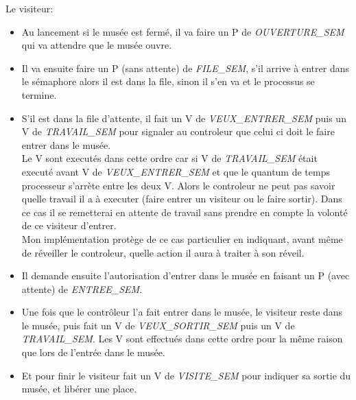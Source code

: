 \documentclass[a4paper,12pt,DIV=16]{scrreprt}
\begin{document}
    Le visiteur:
    \begin{itemize}
        \item Au lancement si le musée est fermé, il va faire un P de \emph{OUVERTURE\_SEM} qui va attendre
            que le musée ouvre.
        \item Il va ensuite faire un P (sans attente) de \emph{FILE\_SEM}, s'il arrive à entrer dans le
            sémaphore alors il est dans la file, sinon il s'en va et le processus se termine.
        \item S'il est dans la file d'attente, il fait un V de \emph{VEUX\_ENTRER\_SEM} puis un V de
            \emph{TRAVAIL\_SEM} pour signaler au controleur que celui ci doit le faire entrer dans le musée.\\
            Le V sont executés dans cette ordre car si V de \emph{TRAVAIL\_SEM} était executé avant V de
            \emph{VEUX\_ENTRER\_SEM} et que le quantum de temps processeur s'arrète entre les deux V.
            Alors le controleur ne peut pas savoir quelle travail il a à executer (faire entrer un
            visiteur ou le faire sortir). Dans ce cas il se remetterai en attente de travail sans
            prendre en compte la volonté de ce visiteur d'entrer.\\
            Mon implémentation protège de ce cas particulier en indiquant, avant même de réveiller
            le controleur, quelle action il aura à traiter à son réveil.
        \item Il demande ensuite l'autorisation d'entrer dans le musée en faisant un P (avec attente)
            de \emph{ENTREE\_SEM}.
        \item Une fois que le contrôleur l'a fait entrer dans le musée, le visiteur reste dans le
            musée, puis fait un V de \emph{VEUX\_SORTIR\_SEM} puis un V de \emph{TRAVAIL\_SEM}. Les V sont
            effectués dans cette ordre pour la même raison que lors de l'entrée dans le musée.
        \item Et pour finir le visiteur fait un V de \emph{VISITE\_SEM} pour indiquer sa sortie du musée,
            et libérer une place.
    \end{itemize}

     \\
\end{document}
